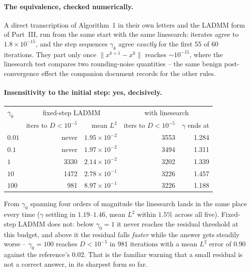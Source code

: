 \documentclass[11pt]{article}
\begin{document}
\paragraph{The equivalence, checked numerically.} A direct transcription of
Algorithm~1 in their own letters and the LADMM form of Part~III, run from the
same start with the same linesearch: iterates agree to $1.8\times10^{-15}$, and
the step sequences $\gamma_k$ agree \emph{exactly} for the first 55 of 60
iterations. They part only once $\|x^{k+1}-x^k\|$ reaches
$\sim\!10^{-15}$, where the linesearch test compares two rounding-noise
quantities -- the same benign post-convergence effect the companion document
records for the other rules.

\paragraph{Insensitivity to the initial step: yes, decisively.}
\begin{center}
\begin{tabular}{@{}lrrrr@{}}
\toprule
$\gamma_0$ & \multicolumn{2}{c}{fixed-step LADMM} & \multicolumn{2}{c}{with linesearch}\\
 & iters to $D<10^{-5}$ & mean $L^2$ & iters to $D<10^{-5}$ & $\gamma$ ends at\\
\midrule
$0.01$ & never & $1.95\times10^{-2}$ & 3553 & 1.284\\
$0.1$  & never & $1.97\times10^{-2}$ & 3494 & 1.311\\
$1$    & 3330  & $2.14\times10^{-2}$ & 3202 & 1.339\\
$10$   & 1472  & $2.78\times10^{-1}$ & 3226 & 1.457\\
$100$  & 981   & $8.97\times10^{-1}$ & 3226 & 1.188\\
\bottomrule
\end{tabular}
\end{center}
From $\gamma_0$ spanning four orders of magnitude the linesearch lands in the
same place every time ($\gamma$ settling in $1.19$--$1.46$, mean $L^2$ within
$1.5\%$ across all five). Fixed-step LADMM does not: below $\gamma_0=1$ it never
reaches the residual threshold at this budget, and above it the residual falls
\emph{faster} while the answer gets steadily worse -- $\gamma_0=100$ reaches
$D<10^{-5}$ in 981 iterations with a mean $L^2$ error of $0.90$ against the
reference's $0.02$. That is the familiar warning that a small residual is not a
correct answer, in its sharpest form so far.
\end{document}
